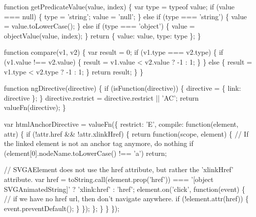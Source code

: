 \begin{DoxyCodeInclude}
{{{{  \textcolor{keyword}{function} getPredicateValue(value, index) \{
    var type = typeof value;
    \textcolor{keywordflow}{if} (value === null) \{
      type = \textcolor{stringliteral}{'string'};
      value = \textcolor{stringliteral}{'null'};
    \} \textcolor{keywordflow}{else} \textcolor{keywordflow}{if} (type === \textcolor{stringliteral}{'string'}) \{
      value = value.toLowerCase();
    \} \textcolor{keywordflow}{else} \textcolor{keywordflow}{if} (type === \textcolor{stringliteral}{'object'}) \{
      value = objectValue(value, index);
    \}
    \textcolor{keywordflow}{return} \{ value: value, type: type \};
  \}

  \textcolor{keyword}{function} compare(v1, v2) \{
    var result = 0;
    \textcolor{keywordflow}{if} (v1.type === v2.type) \{
      \textcolor{keywordflow}{if} (v1.value !== v2.value) \{
        result = v1.value < v2.value ? -1 : 1;
      \}
    \} \textcolor{keywordflow}{else} \{
      result = v1.type < v2.type ? -1 : 1;
    \}
    \textcolor{keywordflow}{return} result;
  \}
\}

\textcolor{keyword}{function} ngDirective(directive) \{
  \textcolor{keywordflow}{if} (isFunction(directive)) \{
    directive = \{
      link: directive
    \};
  \}
  directive.restrict = directive.restrict || \textcolor{stringliteral}{'AC'};
  \textcolor{keywordflow}{return} valueFn(directive);
\}

var htmlAnchorDirective = valueFn(\{
  restrict: \textcolor{charliteral}{'E'},
  compile: \textcolor{keyword}{function}(element, attr) \{
    \textcolor{keywordflow}{if} (!attr.href && !attr.xlinkHref) \{
      \textcolor{keywordflow}{return} \textcolor{keyword}{function}(scope, element) \{
        \textcolor{comment}{// If the linked element is not an anchor tag anymore, do nothing}
        \textcolor{keywordflow}{if} (element[0].nodeName.toLowerCase() !== \textcolor{charliteral}{'a'}) \textcolor{keywordflow}{return};

        \textcolor{comment}{// SVGAElement does not use the href attribute, but rather the 'xlinkHref' attribute.}
        var href = toString.call(element.prop(\textcolor{stringliteral}{'href'})) === \textcolor{stringliteral}{'[object SVGAnimatedString]'} ?
                   \textcolor{stringliteral}{'xlink:href'} : \textcolor{stringliteral}{'href'};
        element.on(\textcolor{stringliteral}{'click'}, \textcolor{keyword}{function}(event) \{
          \textcolor{comment}{// if we have no href url, then don't navigate anywhere.}
          \textcolor{keywordflow}{if} (!element.attr(href)) \{
            event.preventDefault();
          \}
        \});
      \};
    \}
  \}
\});

}}}}
\end{DoxyCodeInclude}
